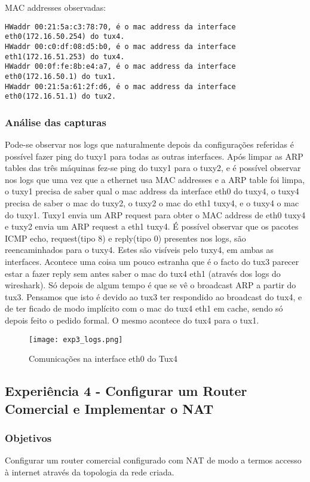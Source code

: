 \documentclass[a4paper]{article}
\begin{document}
MAC addresses observadas:
\begin{verbatim}
HWaddr 00:21:5a:c3:78:70, é o mac address da interface eth0(172.16.50.254) do tux4.
HWaddr 00:c0:df:08:d5:b0, é o mac address da interface eth1(172.16.51.253) do tux4.
HWaddr 00:0f:fe:8b:e4:a7, é o mac address da interface eth0(172.16.50.1) do tux1.
HWaddr 00:21:5a:61:2f:d6, é o mac address da interface eth0(172.16.51.1) do tux2.
\end{verbatim}

\subsubsection{Análise das capturas}
Pode-se observar nos logs que naturalmente depois da configurações referidas é possível fazer ping do tuxy1 para todas as outras interfaces.
Após limpar as ARP tables das três máquinas fez-se ping do tuxy1 para o tuxy2, e é possível observar nos logs que uma vez que a ethernet usa MAC addresses e a ARP table foi limpa, o tuxy1 precisa de saber qual o mac address da interface eth0 do tuxy4, o tuxy4 precisa de saber o mac do tuxy2, o tuxy2 o mac do eth1 tuxy4, e o tuxy4 o mac do tuxy1. Tuxy1 envia um ARP request para obter o MAC address de eth0 tuxy4 e tuxy2 envia um ARP request a eth1 tuxy4.
É possível observar que os pacotes ICMP echo, request(tipo 8) e reply(tipo 0) presentes nos logs, são reencaminhados para o tuxy4. Estes são visíveis pelo tuxy4, em ambas as interfaces. Acontece uma coisa um pouco estranha que é o facto do tux3 parecer estar a fazer reply sem antes saber o mac do tux4 eth1 (através dos logs do wireshark). Só depois de algum tempo é que se vê o broadcast ARP a partir do tux3. Pensamos que isto é devido ao tux3 ter respondido ao broadcast do tux4, e de ter ficado de modo implícito com o mac do tux4 eth1 em cache, sendo só depois feito o pedido formal. O mesmo acontece do tux4 para o tux1.

\begin{figure}[h]
    \centering
    \texttt{[image: exp3\_logs.png]}
    \caption{Comunicações na interface eth0 do Tux4}
\end{figure}

\subsection{Experiência 4 - Configurar um Router Comercial e Implementar o NAT}

\subsubsection{Objetivos}
Configurar um router comercial configurado com NAT de modo a termos accesso à
internet através da topologia da rede criada.
\end{document}
